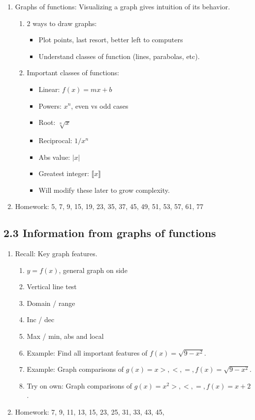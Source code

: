 \documentclass{article}
\begin{document}
\begin{enumerate}
\item Graphs of functions: Visualizing a graph gives intuition of its behavior.
\begin{enumerate}
\item 2 ways to draw graphs:
\begin{itemize}
\item Plot points, last resort, better left to computers
\item Understand classes of function (lines, parabolas, etc).
\end{itemize}
\item Important classes of functions:
\begin{itemize}
\item Linear: $f(x)=mx+b$
\item Powers: $x^n$, even vs odd cases
\item Root: $\sqrt[n]{x}$
\item Reciprocal: $1/x^n$
\item Abs value: $|x|$
\item Greatest integer: $\llbracket x \rrbracket$
\item Will modify these later to grow complexity.
\end{itemize}
\end{enumerate}

\item Homework: 5, 7, 9, 15, 19, 23, 35, 37, 45, 49, 51, 53, 57, 61, 77

\end{enumerate}


\subsection{2.3 Information from graphs of functions}

\begin{enumerate}

\item Recall: Key graph features.
\begin{enumerate}
\item $y=f(x)$, general graph on side
\item Vertical line test
\item Domain / range
\item Inc / dec
\item Max / min, abs and local
\item Example: Find all important features of $f(x) = \sqrt{9-x^2}$.
\item Example: Graph comparisons of $g(x)=x > , <, =, f(x)=\sqrt{9-x^2}$.
\item Try on own: Graph comparisons of $g(x)=x^2 > , <, =, f(x)=x+2$.
\end{enumerate} 

\item Homework: 7, 9, 11, 13, 15, 23, 25, 31, 33, 43, 45, 





\end{enumerate}
\end{document}
